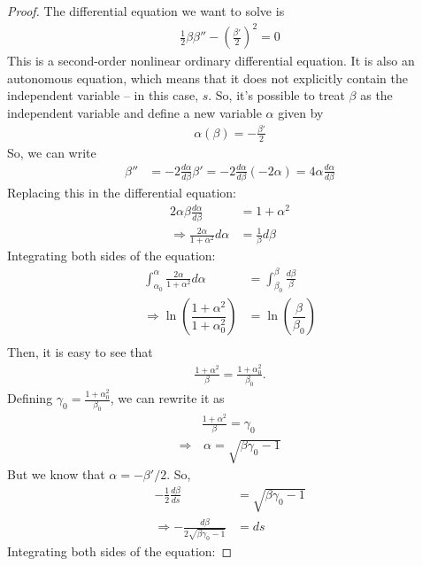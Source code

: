 \begin{proof}
	The differential equation we want to solve is
	\begin{align*}
		\frac{1}{2}\beta\beta'' - \left(\frac{\beta'}{2}\right)^2=0
	\end{align*}
	This is a second-order nonlinear ordinary differential equation. It is also an autonomous equation, which means that it does not explicitly contain the independent variable -- in this case, $s$. So, it's possible to treat $\beta$ as the independent variable and define a new variable $\alpha$ given by
	\begin{align*}
		\alpha(\beta) = -\frac{\beta'}{2}
	\end{align*}
	So, we can write
    \begin{align*}
		\beta'' &= -2\frac{d\alpha}{d \beta}\beta' = -2\frac{d\alpha}{d \beta}(-2\alpha) = 4\alpha\frac{d\alpha}{d\beta}
	\end{align*}
	Replacing this in the differential equation:
	\begin{align*}
		2\alpha\beta\frac{d\alpha}{d\beta} &= 1 + \alpha^2\\
		\Rightarrow \frac{2\alpha}{1+\alpha^2}d\alpha &= \frac{1}{\beta}d\beta
	\end{align*}
	Integrating both sides of the equation:
	\begin{align*}
		\int_{\alpha_0}^{\alpha} \frac{2\alpha}{1+\alpha^2}d\alpha &= \int_{\beta_0}^{\beta} \frac{d\beta}{\beta}\\
		\Rightarrow \ln\left(\dfrac{1+\alpha^2}{1+\alpha_0^2}\right) &= \ln\left(\dfrac{\beta}{\beta_0}\right)\\
	\end{align*}
	Then, it is easy to see that
    \begin{align*}
    	\frac{1+\alpha^2}{\beta} = \frac{1+\alpha_0^2}{\beta_0}.
	\end{align*}
	Defining $\gamma_0 = \frac{1+\alpha_0^2}{\beta_0}$, we can rewrite it as
	\begin{align*}
		&\frac{1+\alpha^2}{\beta} = \gamma_0\\
		\Rightarrow & \,\alpha = \sqrt{\beta\gamma_0 -1}
	\end{align*}
	But we know that $\alpha = -\beta'/2$. So,
	\begin{align*}
		-\frac{1}{2}\frac{d\beta}{ds} &= \sqrt{\beta\gamma_0 -1}\\
		\Rightarrow -\frac{d\beta}{2\sqrt{\beta\gamma_0 -1}} &= ds
	\end{align*}
	Integrating both sides of the equation:

\end{proof}
